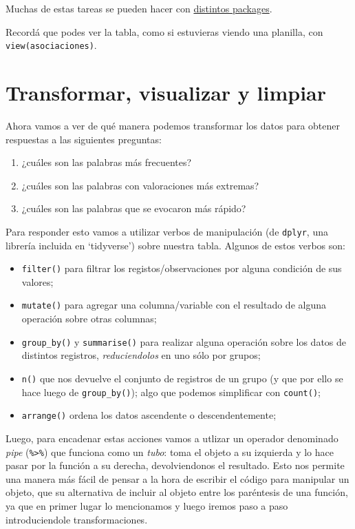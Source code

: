 \documentclass[
]{book}
\providecommand{\tightlist}{%
  \setlength{\itemsep}{0pt}\setlength{\parskip}{0pt}}
\begin{document}
Muchas de estas tareas se pueden hacer con \href{https://www.groundai.com/project/the-landscape-of-r-packages-for-automated-exploratory-data-analysis/1}{distintos packages}.

Recordá que podes ver la tabla, como si estuvieras viendo una planilla, con \texttt{view(asociaciones)}.

\hypertarget{transformar-visualizar-y-limpiar}{%
\section{Transformar, visualizar y limpiar}\label{transformar-visualizar-y-limpiar}}

Ahora vamos a ver de qué manera podemos transformar los datos para obtener respuestas a las siguientes preguntas:

\begin{enumerate}
\def\labelenumi{\arabic{enumi}.}
\tightlist
\item
  ¿cuáles son las palabras más frecuentes?
\item
  ¿cuáles son las palabras con valoraciones más extremas?
\item
  ¿cuáles son las palabras que se evocaron más rápido?
\end{enumerate}

Para responder esto vamos a utilizar verbos de manipulación (de \texttt{dplyr}, una librería incluida en `tidyverse') sobre nuestra tabla. Algunos de estos verbos son:

\begin{itemize}
\tightlist
\item
  \texttt{filter()} para filtrar los registos/observaciones por alguna condición de sus valores;
\item
  \texttt{mutate()} para agregar una columna/variable con el resultado de alguna operación sobre otras columnas;
\item
  \texttt{group\_by()} y \texttt{summarise()} para realizar alguna operación sobre los datos de distintos registros, \emph{reduciendolos} en uno sólo por grupos;
\item
  \texttt{n()} que nos devuelve el conjunto de registros de un grupo (y que por ello se hace luego de \texttt{group\_by()}); algo que podemos simplificar con \texttt{count()};
\item
  \texttt{arrange()} ordena los datos ascendente o descendentemente;
\end{itemize}

Luego, para encadenar estas acciones vamos a utlizar un operador denominado \emph{pipe} (\texttt{\%\textgreater{}\%}) que funciona como un \emph{tubo}: toma el objeto a su izquierda y lo hace pasar por la función a su derecha, devolviendonos el resultado.
Esto nos permite una manera más fácil de pensar a la hora de escribir el código para manipular un objeto, que su alternativa de incluir al objeto entre los paréntesis de una función, ya que en primer lugar lo mencionamos y luego iremos paso a paso introduciendole transformaciones.
\end{document}
